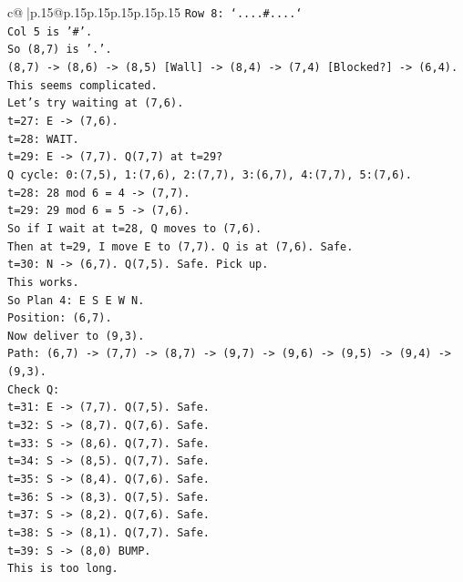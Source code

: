 \documentclass{article}
\begin{document}
{\begin{supertabular}{c@{$\;$}|p{.15\linewidth}@{}p{.15\linewidth}p{.15\linewidth}p{.15\linewidth}p{.15\linewidth}p{.15\linewidth}}
{{{\texttt{Row 8: `....\#....`} \\
\texttt{Col 5 is '\#'.} \\
\texttt{So (8,7) is '.'.} \\
\texttt{(8,7) {-}> (8,6) {-}> (8,5) {[}Wall{]} {-}> (8,4) {-}> (7,4) {[}Blocked?{]} {-}> (6,4).} \\
\texttt{This seems complicated.} \\
\texttt{Let's try waiting at (7,6).} \\
\texttt{t=27: E {-}> (7,6).} \\
\texttt{t=28: WAIT.} \\
\texttt{t=29: E {-}> (7,7). Q(7,7) at t=29?} \\
\texttt{Q cycle: 0:(7,5), 1:(7,6), 2:(7,7), 3:(6,7), 4:(7,7), 5:(7,6).} \\
\texttt{t=28: 28 mod 6 = 4 {-}> (7,7).} \\
\texttt{t=29: 29 mod 6 = 5 {-}> (7,6).} \\
\texttt{So if I wait at t=28, Q moves to (7,6).} \\
\texttt{Then at t=29, I move E to (7,7). Q is at (7,6). Safe.} \\
\texttt{t=30: N {-}> (6,7). Q(7,5). Safe. Pick up.} \\
\texttt{This works.} \\
\texttt{So Plan 4: E S E W N.} \\
\texttt{Position: (6,7).} \\
\texttt{Now deliver to (9,3).} \\
\texttt{Path: (6,7) {-}> (7,7) {-}> (8,7) {-}> (9,7) {-}> (9,6) {-}> (9,5) {-}> (9,4) {-}> (9,3).} \\
\texttt{Check Q:} \\
\texttt{t=31: E {-}> (7,7). Q(7,5). Safe.} \\
\texttt{t=32: S {-}> (8,7). Q(7,6). Safe.} \\
\texttt{t=33: S {-}> (8,6). Q(7,7). Safe.} \\
\texttt{t=34: S {-}> (8,5). Q(7,7). Safe.} \\
\texttt{t=35: S {-}> (8,4). Q(7,6). Safe.} \\
\texttt{t=36: S {-}> (8,3). Q(7,5). Safe.} \\
\texttt{t=37: S {-}> (8,2). Q(7,6). Safe.} \\
\texttt{t=38: S {-}> (8,1). Q(7,7). Safe.} \\
\texttt{t=39: S {-}> (8,0) BUMP.} \\
\texttt{This is too long.} \\
}}}
\end{supertabular}}
\end{document}
